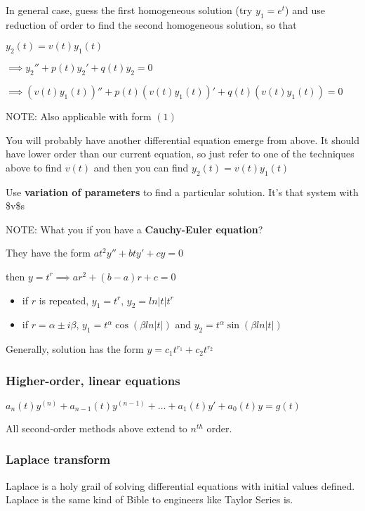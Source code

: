 \documentclass[12pt]{article}
\begin{document}
In general case, guess the first homogeneous solution (try \(y_1=e^t\)) and
use reduction of order to find the second homogeneous solution, so that

\(y_2(t) = v(t)y_1(t)\)

\(\implies y_2'' + p(t)y_2' + q(t)y_2 = 0\)

\(\implies (v(t)y_1(t))''+p(t)(v(t)y_1(t))'+q(t)(v(t)y_1(t))=0\)

NOTE: Also applicable with form \((1)\)

You will probably have another differential equation emerge from above. It
should have lower order than our current equation, so just refer to one of
the techniques above to find \(v(t)\) and then you can find
\(y_2(t)=v(t)y_1(t)\)

Use \textbf{variation of parameters} to find a particular solution. It's that
system with \$v\$s

NOTE: What you if you have a \textbf{Cauchy-Euler equation}?

They have the form \(at^2y''+bty'+cy=0\)

then \(y=t^r \implies ar^2+(b-a)r+c=0\)

\begin{itemize}
\item if \(r\) is repeated, \(y_1=t^r\), \(y_2=ln|t|t^r\)
\item if \(r=\alpha\pm i\beta\), \(y_1=t^{\alpha}\cos(\beta ln|t|)\) and
\(y_2=t^{\alpha}\sin(\beta ln|t|)\)
\end{itemize}

Generally, solution has the form \(y=c_1t^{r_1}+c_2t^{r_2}\)

\subsubsection*{Higher-order, linear equations}
\label{sec:org4cc446e}

\(a_n(t)y^{(n)}+a_{n-1}(t)y^{(n-1)}+\ldots+a_1(t)y'+a_0(t)y=g(t)\)

All second-order methods above extend to \(n^{th}\) order.

\subsubsection*{Laplace transform}
\label{sec:org63492bd}

Laplace is a holy grail of solving differential equations with initial
values defined. Laplace is the same kind of Bible to engineers like Taylor
Series is. 
\end{document}
